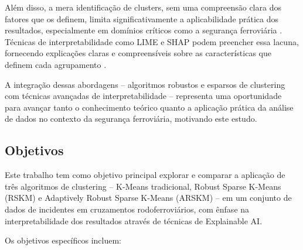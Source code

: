\documentclass[conference]{IEEEtran}
\begin{document}
Além disso, a mera identificação de clusters, sem uma compreensão clara dos fatores que os definem, limita significativamente a aplicabilidade prática dos resultados, especialmente em domínios críticos como a segurança ferroviária \cite{guidotti2018survey}. Técnicas de interpretabilidade como LIME e SHAP podem preencher essa lacuna, fornecendo explicações claras e compreensíveis sobre as características que definem cada agrupamento \cite{ribeiro2016should, lundberg2017unified}.

A integração dessas abordagens – algoritmos robustos e esparsos de clustering com técnicas avançadas de interpretabilidade – representa uma oportunidade para avançar tanto o conhecimento teórico quanto a aplicação prática da análise de dados no contexto da segurança ferroviária, motivando este estudo.

\subsection{Objetivos}
Este trabalho tem como objetivo principal explorar e comparar a aplicação de três algoritmos de clustering – K-Means tradicional, Robust Sparse K-Means (RSKM) e Adaptively Robust Sparse K-Means (ARSKM) – em um conjunto de dados de incidentes em cruzamentos rodoferroviários, com ênfase na interpretabilidade dos resultados através de técnicas de Explainable AI.

Os objetivos específicos incluem:
\end{document}
